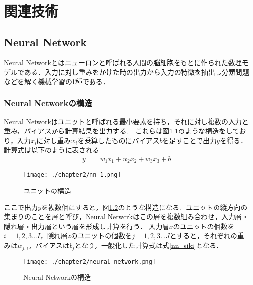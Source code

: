 
\chapter{関連技術}

\section{Neural Network}
Neural Networkとはニューロンと呼ばれる人間の脳細胞をもとに作られた数理モデルである．入力に対し重みをかけた時の出力から入力の特徴を抽出し分類問題などを解く機械学習の1種である．

\subsection{Neural Networkの構造}
Neural Networkはユニットと呼ばれる最小要素を持ち，それに対し複数の入力と重み，バイアスから計算結果を出力する．
これらは図\ref{fig_NN1}のような構造をしており，入力$x_i$に対し重み$w_i$を乗算したものにバイアス$b$を足すことで出力$y$を得る．計算式は以下のように表される．
\begin{align}
y &= w_{1}x_{1} + w_{2}x_{2} + w_{3}x_{3} + b
\end{align}
\begin{figure}[htbp]
  \begin{center}
    \texttt{[image: ./chapter2/nn\_1.png]}
    \caption{ユニットの構造}
    \label{fig_NN1}
  \end{center}
\end{figure}

ここで出力$y$を複数個にすると，図\ref{fig_NN}のような構造になる．ユニットの縦方向の集まりのことを層と呼び，Neural Networkはこの層を複数組み合わせ，入力層・隠れ層・出力層という層を形成し計算を行う．
入力層$x$のユニットの個数を$i=1,2,3\ldots I$，隠れ層$z$のユニットの個数を$j=1,2,3\ldots J$とすると，それぞれの重みは$w_{j,i}$，バイアスは$b_j$となり，一般化した計算式は式\ref{nn_siki}となる．
\begin{figure}[htbp]
  \begin{center}
    \texttt{[image: ./chapter2/neural\_network.png]}
    \caption{Neural Networkの構造}
    \label{fig_NN}
  \end{center}
\end{figure}

